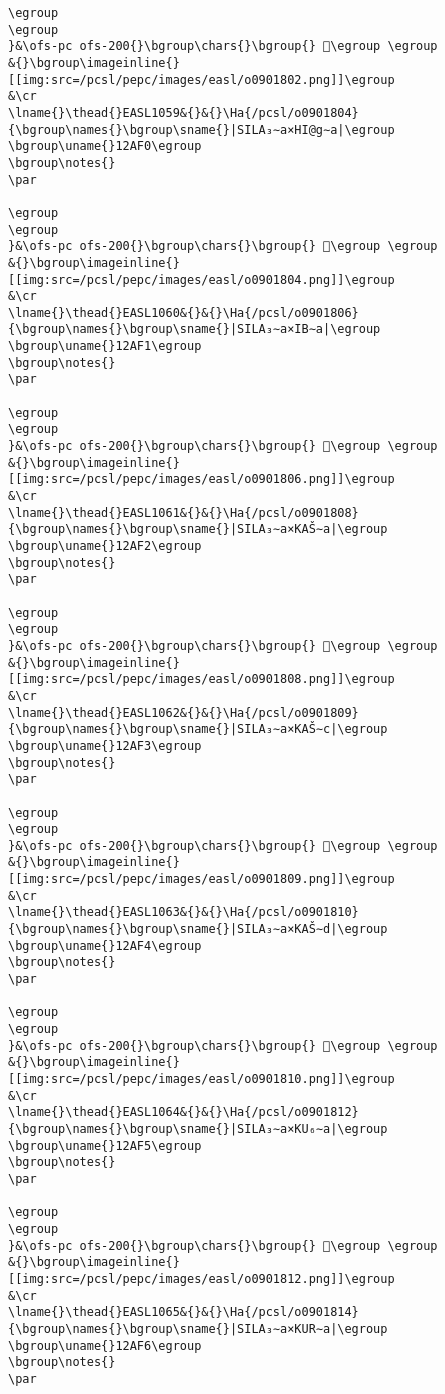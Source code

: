 \begin{verbatim}
\egroup
\egroup
}&\ofs-pc ofs-200{}\bgroup\chars{}\bgroup{} 𒫯\egroup \egroup
&{}\bgroup\imageinline{}[[img:src=/pcsl/pepc/images/easl/o0901802.png]]\egroup
&\cr
\lname{}\thead{}EASL1059&{}&{}\Ha{/pcsl/o0901804}{\bgroup\names{}\bgroup\sname{}|SILA₃∼a×HI@g∼a|\egroup
\bgroup\uname{}12AF0\egroup
\bgroup\notes{}
\par 

\egroup
\egroup
}&\ofs-pc ofs-200{}\bgroup\chars{}\bgroup{} 𒫰\egroup \egroup
&{}\bgroup\imageinline{}[[img:src=/pcsl/pepc/images/easl/o0901804.png]]\egroup
&\cr
\lname{}\thead{}EASL1060&{}&{}\Ha{/pcsl/o0901806}{\bgroup\names{}\bgroup\sname{}|SILA₃∼a×IB∼a|\egroup
\bgroup\uname{}12AF1\egroup
\bgroup\notes{}
\par 

\egroup
\egroup
}&\ofs-pc ofs-200{}\bgroup\chars{}\bgroup{} 𒫱\egroup \egroup
&{}\bgroup\imageinline{}[[img:src=/pcsl/pepc/images/easl/o0901806.png]]\egroup
&\cr
\lname{}\thead{}EASL1061&{}&{}\Ha{/pcsl/o0901808}{\bgroup\names{}\bgroup\sname{}|SILA₃∼a×KAŠ∼a|\egroup
\bgroup\uname{}12AF2\egroup
\bgroup\notes{}
\par 

\egroup
\egroup
}&\ofs-pc ofs-200{}\bgroup\chars{}\bgroup{} 𒫲\egroup \egroup
&{}\bgroup\imageinline{}[[img:src=/pcsl/pepc/images/easl/o0901808.png]]\egroup
&\cr
\lname{}\thead{}EASL1062&{}&{}\Ha{/pcsl/o0901809}{\bgroup\names{}\bgroup\sname{}|SILA₃∼a×KAŠ∼c|\egroup
\bgroup\uname{}12AF3\egroup
\bgroup\notes{}
\par 

\egroup
\egroup
}&\ofs-pc ofs-200{}\bgroup\chars{}\bgroup{} 𒫳\egroup \egroup
&{}\bgroup\imageinline{}[[img:src=/pcsl/pepc/images/easl/o0901809.png]]\egroup
&\cr
\lname{}\thead{}EASL1063&{}&{}\Ha{/pcsl/o0901810}{\bgroup\names{}\bgroup\sname{}|SILA₃∼a×KAŠ∼d|\egroup
\bgroup\uname{}12AF4\egroup
\bgroup\notes{}
\par 

\egroup
\egroup
}&\ofs-pc ofs-200{}\bgroup\chars{}\bgroup{} 𒫴\egroup \egroup
&{}\bgroup\imageinline{}[[img:src=/pcsl/pepc/images/easl/o0901810.png]]\egroup
&\cr
\lname{}\thead{}EASL1064&{}&{}\Ha{/pcsl/o0901812}{\bgroup\names{}\bgroup\sname{}|SILA₃∼a×KU₆∼a|\egroup
\bgroup\uname{}12AF5\egroup
\bgroup\notes{}
\par 

\egroup
\egroup
}&\ofs-pc ofs-200{}\bgroup\chars{}\bgroup{} 𒫵\egroup \egroup
&{}\bgroup\imageinline{}[[img:src=/pcsl/pepc/images/easl/o0901812.png]]\egroup
&\cr
\lname{}\thead{}EASL1065&{}&{}\Ha{/pcsl/o0901814}{\bgroup\names{}\bgroup\sname{}|SILA₃∼a×KUR∼a|\egroup
\bgroup\uname{}12AF6\egroup
\bgroup\notes{}
\par 


\end{verbatim}
